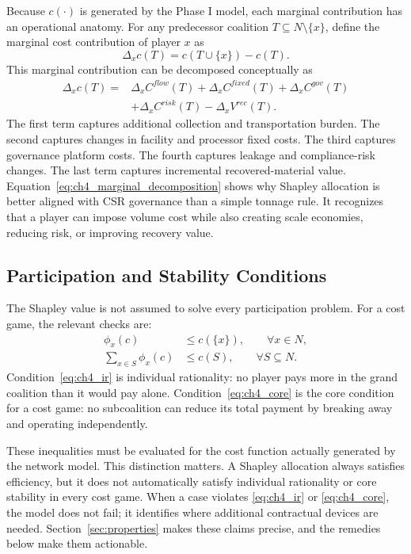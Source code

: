 Because $c(\cdot)$ is generated by the Phase I model, each marginal contribution has an operational anatomy. For any predecessor coalition $T\subseteq N\setminus\{x\}$, define the marginal cost contribution of player $x$ as
\begin{equation}
\label{eq:ch4_marginal_cost}
\Delta_x c(T)=c(T\cup\{x\})-c(T).
\end{equation}
This marginal contribution can be decomposed conceptually as
\begin{equation}
\label{eq:ch4_marginal_decomposition}
\begin{aligned}
\Delta_x c(T)=&
\Delta_x C^{flow}(T)
+\Delta_x C^{fixed}(T)
+\Delta_x C^{gov}(T)\\
&+\Delta_x C^{risk}(T)
-\Delta_x V^{rec}(T).
\end{aligned}
\end{equation}
The first term captures additional collection and transportation burden. The second captures changes in facility and processor fixed costs. The third captures governance platform costs. The fourth captures leakage and compliance-risk changes. The last term captures incremental recovered-material value. Equation~\eqref{eq:ch4_marginal_decomposition} shows why Shapley allocation is better aligned with CSR governance than a simple tonnage rule. It recognizes that a player can impose volume cost while also creating scale economies, reducing risk, or improving recovery value.

\subsection{Participation and Stability Conditions}

The Shapley value is not assumed to solve every participation problem. For a cost game, the relevant checks are:
\begin{align}
\label{eq:ch4_ir}
\phi_x(c)&\leq c(\{x\}),
\qquad \forall x\in N,\\
\label{eq:ch4_core}
\sum_{x\in S}\phi_x(c)&\leq c(S),
\qquad \forall S\subseteq N.
\end{align}
Condition~\eqref{eq:ch4_ir} is individual rationality: no player pays more in the grand coalition than it would pay alone. Condition~\eqref{eq:ch4_core} is the core condition for a cost game: no subcoalition can reduce its total payment by breaking away and operating independently.

These inequalities must be evaluated for the cost function actually generated by the network model. This distinction matters. A Shapley allocation always satisfies efficiency, but it does not automatically satisfy individual rationality or core stability in every cost game. When a case violates \eqref{eq:ch4_ir} or \eqref{eq:ch4_core}, the model does not fail; it identifies where additional contractual devices are needed. Section~\ref{sec:properties} makes these claims precise, and the remedies below make them actionable.

